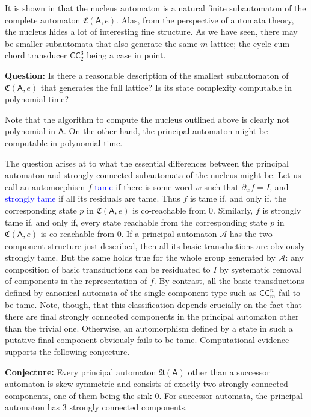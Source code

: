 \documentclass[12pt]{svmult}
\def\emph#1{\textcolor{blue}{#1}}
\def\CCC#1#2{\mathsf{CC}^{#1}_{#2}}
\def\cA{\mathcal{A}}
\def\resid#1#2{\partial_{#1}{#2}}         %
\def\AA{\mathsf{A}}             %
\def\cmpaut{\fC}                %
\def\fA{\mathfrak{A}}
\def\fC{\mathfrak{C}}           %
\begin{document}
It is shown in \cite{Nekrashevych05:self_similar_groups} that the nucleus 
automaton is a natural finite subautomaton of the complete automaton $\cmpaut(\AA,e)$. 
Alas, from the perspective of automata theory, the nucleus hides a lot of interesting
fine structure. 
As we have seen, there may be smaller subautomata that also generate the same 
$m$-lattice; the cycle-cum-chord transducer $\CCC{3}{2}$ being a case in point. 

\textbf{Question:}
Is there a reasonable description of the smallest subautomaton of $\cmpaut(\AA,e)$ 
that generates the full lattice?  Is its state complexity computable in polynomial time? 
\vspace{1ex} 

Note that the algorithm to compute the nucleus outlined above is clearly not polynomial 
in $\AA$. 
On the other hand, the principal automaton might be computable in polynomial time. 


The question arises at to what the essential differences between the principal automaton and 
strongly connected subautomata of the nucleus might be. 
Let us call an automorphism $f$ \emph{tame} if there is some word $w$ such that $\resid{w}{f} = I$, 
and \emph{strongly tame} if all its residuals are tame.
Thus $f$ is tame if, and only if, the corresponding state $p$ in $\cmpaut(\AA,e)$ is co-reachable from $0$. 
Similarly,  $f$ is strongly tame if, and only if, every state reachable from the corresponding state $p$ 
in $\cmpaut(\AA,e)$ is co-reachable from $0$. 
If a principal automaton $\cA$ has the two component structure just described, then all its 
basic transductions are obviously strongly tame. 
But the same holds true for the whole group generated by $\cA$: any composition of basic 
transductions can be residuated to $I$ by systematic removal of components in the representation
of $f$. 
By contrast, all the basic transductions defined by canonical automata of the single component 
type such as $\CCC{n}{m}$ fail to be tame. 
Note, though, that this classification depends crucially on the fact that there are final 
strongly connected components in the principal automaton other than the trivial one. 
Otherwise, an automorphism defined by a state in such a putative final component 
obviously fails to be tame. 
Computational evidence supports the following conjecture. 
\vspace{1ex} 

\textbf{Conjecture:}
Every principal automaton $\fA(\AA)$ other than a successor automaton is skew-symmetric 
and consists of exactly two strongly connected components, one of them being the 
sink $0$.
For successor automata, the principal automaton has 3 strongly connected components. 
\vspace{1ex} 
\end{document}
